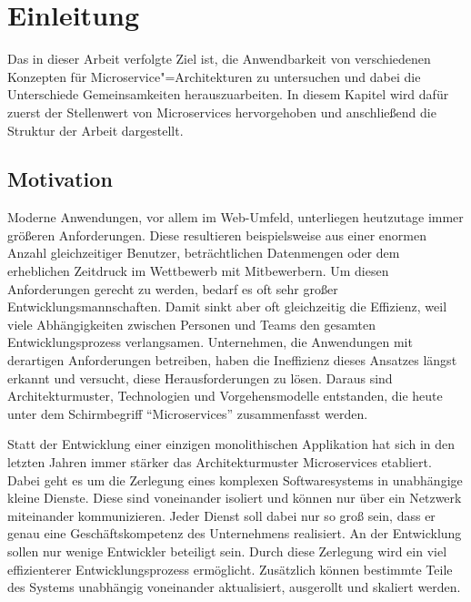 \chapter{Einleitung}

Das in dieser Arbeit verfolgte Ziel ist, die Anwendbarkeit von verschiedenen Konzepten für Microservice"=Architekturen zu untersuchen und dabei die Unterschiede \bzw Gemeinsamkeiten herauszuarbeiten. In diesem Kapitel wird dafür zuerst der Stellenwert von Microservices hervorgehoben und anschließend die Struktur der Arbeit dargestellt.

\section{Motivation}

Moderne Anwendungen, vor allem im Web-Umfeld, unterliegen heutzutage immer größeren Anforderungen. Diese resultieren beispielsweise aus einer enormen Anzahl gleichzeitiger Benutzer, beträchtlichen Datenmengen oder dem erheblichen Zeitdruck im Wettbewerb mit Mitbewerbern. Um diesen Anforderungen gerecht zu werden, bedarf es oft sehr großer Entwicklungsmannschaften. Damit sinkt aber oft gleichzeitig die Effizienz, weil viele Abhängigkeiten zwischen Personen und Teams den gesamten Entwicklungsprozess verlangsamen. Unternehmen, die Anwendungen mit derartigen Anforderungen betreiben, haben die Ineffizienz dieses Ansatzes längst erkannt und versucht, diese Herausforderungen zu lösen. Daraus sind Architektur\-muster, Technologien und Vorgehensmodelle entstanden, die heute unter dem Schirmbegriff "`Microservices"' zusammenfasst werden.

Statt der Entwicklung einer einzigen monolithischen Applikation hat sich in den letzten Jahren immer stärker das Architekturmuster Microservices etabliert. Dabei geht es um die Zerlegung eines komplexen Softwaresystems in unabhängige kleine Dienste. Diese sind voneinander isoliert und können nur über ein Netzwerk miteinander kommunizieren. Jeder Dienst soll dabei nur so groß sein, dass er genau eine Geschäftskompetenz des Unternehmens realisiert. An der Entwicklung sollen nur wenige Entwickler beteiligt sein. Durch diese Zerlegung wird ein viel effizienterer Entwicklungsprozess ermöglicht. Zusätzlich können bestimmte Teile des Systems unabhängig voneinander aktualisiert, ausgerollt und skaliert werden.

